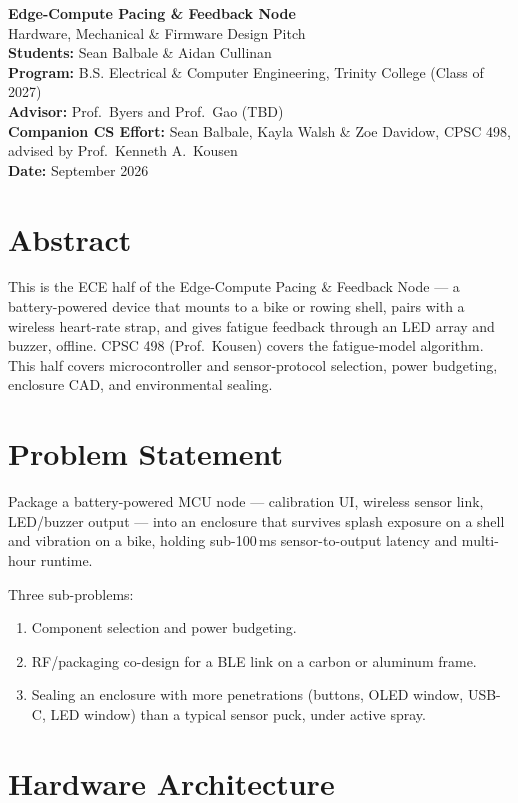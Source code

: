 \documentclass[11pt]{article}
\begin{document}
\begin{center}
{\LARGE \bfseries Edge-Compute Pacing \& Feedback Node}\\[4pt]
{\large Hardware, Mechanical \& Firmware Design Pitch}\\[10pt]
\textbf{Students:} Sean Balbale \& Aidan Cullinan\\
\textbf{Program:} B.S. Electrical \& Computer Engineering, Trinity College (Class of 2027)\\
\textbf{Advisor:} Prof.\ Byers and Prof.\ Gao (TBD)\\
\textbf{Companion CS Effort:} Sean Balbale, Kayla Walsh \& Zoe Davidow, CPSC 498, advised by Prof.\ Kenneth A.\ Kousen\\
\textbf{Date:} September 2026
\end{center}

\section*{Abstract}
This is the ECE half of the Edge-Compute Pacing \& Feedback Node --- a battery-powered device that mounts to a bike or rowing shell, pairs with a wireless heart-rate strap, and gives fatigue feedback through an LED array and buzzer, offline. CPSC 498 (Prof.\ Kousen) covers the fatigue-model algorithm. This half covers microcontroller and sensor-protocol selection, power budgeting, enclosure CAD, and environmental sealing.

\section{Problem Statement}
Package a battery-powered MCU node --- calibration UI, wireless sensor link, LED/buzzer output --- into an enclosure that survives splash exposure on a shell and vibration on a bike, holding sub-100\,ms sensor-to-output latency and multi-hour runtime.

Three sub-problems:
\begin{enumerate}[topsep=2pt,itemsep=2pt]
    \item Component selection and power budgeting.
    \item RF/packaging co-design for a BLE link on a carbon or aluminum frame.
    \item Sealing an enclosure with more penetrations (buttons, OLED window, USB-C, LED window) than a typical sensor puck, under active spray.
\end{enumerate}

\section{Hardware Architecture}
\end{document}
